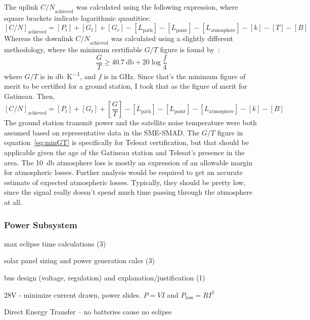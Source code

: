 \documentclass[9pt]{article}
\begin{document}
The uplink ${C/N}_\text{achieved}$ was calculated using the following expression, where square brackets indicate logarithmic quantities:
\begin{equation}\label{eq:uplinkachieved}
  [C/N]_\text{achieved}=[P_t] + [G_t] + [G_r] - [L_\text{path}] - [L_\text{point}] - [L_\text{atmosphere}] - [k] -[T]-[B]
\end{equation}
Whereas the downlink ${C/N}_\text{achieved}$ was calculated using a slightly different methodology, where the minimum certifiable $G/T$ figure is found by~\cite[I, p. 40]{commlinks}:
\begin{equation}\label{eq:minGT}
  \frac GT\ge \qty{40.7}{\decibel}+20\log{\frac f4}
\end{equation}
where $G/T$ is in \si{\decibel\per\kelvin}, and $f$ is in \si{\giga\hertz}.
Since that's the minimum figure of merit to be certified for a ground station, I took that as the figure of merit for Gatineau.
Then,
\begin{equation}\label{eq:downlinkachieved}
  [{C/N}]_\text{achieved}=[P_t]+[G_t]+\left[\frac GT\right]-[L_\text{path}]-[L_\text{point}]-[L_\text{atmosphere}]-[k]-[B]
\end{equation}
The ground station transmit power and the satellite noise temperature were both assumed based on representative data in the SME-SMAD.
The $G/T$ figure in equation~\ref{eq:minGT} is specifically for Telesat certification, but that should be applicable given the age of the Gatineau station and Telesat's presence in the area.
The \qty{10}{\decibel} atmosphere loss is mostly an expression of an allowable margin for atmospheric losses.
Further analysis would be required to get an accurate estimate of expected atmospheric losses.
Typically, they should be pretty low, since the signal really doesn't spend much time passing through the atmosphere at all.

\subsubsection{Power Subsystem}\label{sys:power}
max eclipse time calculations (3)

solar panel sizing and power generation calcs (3)

bus design (voltage, regulation) and explanation/justification (1)

28V - minimize current drawn, power slides. $P=VI$ and $P_{\text{loss}}=RI^2$

Direct Energy Transfer -- no batteries cause no eclipse
\end{document}
